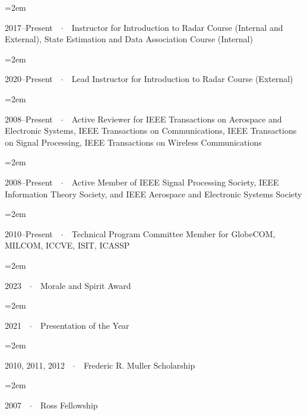 \documentclass{scrartcl}
\newcommand{\MarginText}[1]{\marginpar{\raggedleft\itshape\small#1}} %
\newcommand{\Description}[1]{\hangindent=2em\hangafter=0\noindent\raggedright\footnotesize{#1}\par\normalsize\vspace{1em}} %
\begin{document}
\begin{cv}{}

\vspace{1em}

\Description{2017--Present\ \ $\cdotp$\ \ Instructor for Introduction to Radar Course (Internal and External), State Estimation and Data Association Course (Internal)}

\Description{2020--Present\ \ $\cdotp$\ \ Lead Instructor for Introduction to Radar Course (External)}

\Description{2008--Present\ \ $\cdotp$\ \ Active Reviewer for IEEE Transactions on Aerospace and Electronic Systems, IEEE Transactions on Communications, IEEE Transactions on Signal Processing, IEEE Transactions on Wireless Communications}

\Description{2008--Present\ \ $\cdotp$\ \ Active Member of IEEE Signal Processing Society, IEEE Information Theory Society, and IEEE Aerospace and Electronic Systems Society}

\Description{2010--Present\ \ $\cdotp$\ \ Technical Program Committee Member for GlobeCOM, MILCOM, ICCVE, ISIT, ICASSP}

\vspace{1em} %

\vspace{1em}

\Description{\MarginText{Awards}2023\ \ $\cdotp$\ \ Morale and Spirit Award}

\vspace{-0.5em}

\Description{2021\ \ $\cdotp$\ \ Presentation of the Year}

\vspace{-0.5em}

\Description{2010, 2011, 2012\ \ $\cdotp$\ \ Frederic R. Muller Scholarship}

\vspace{-0.5em} %

\Description{2007\ \ $\cdotp$\ \ Ross Fellowship}

\vspace{-0.5em} %


\end{cv}
\end{document}
